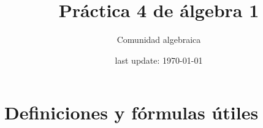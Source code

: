 

\usepackage{polynom} %




\title{Práctica 4 de álgebra 1} %
\author{Comunidad algebraica} %
\date{last update: \today} %

\maketitle  %
\section{Definiciones y fórmulas útiles}

